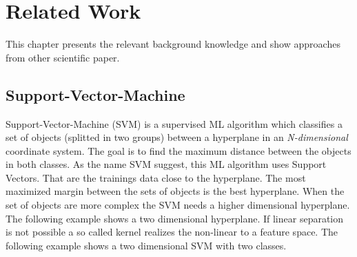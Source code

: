 
\section{Related Work}
\label{sec:relWork}

This chapter presents the relevant background knowledge and show approaches from other scientific paper.

\subsection{Support-Vector-Machine}

Support-Vector-Machine (SVM) is a supervised ML algorithm which classifies a set of objects (splitted in two groups) between a hyperplane in an \textit{N-dimensional} coordinate system. The goal is to find the maximum distance between the objects in both classes. As the name SVM suggest, this ML algorithm uses Support Vectors. That are the trainings data close to the hyperplane. The most maximized margin between the sets of objects is the best hyperplane. When the set of objects are more complex the SVM needs a higher dimensional hyperplane. The following example shows a two dimensional hyperplane. If linear separation is not possible a so called kernel realizes the non-linear to a feature space. The following example shows a two dimensional SVM with two classes. \\ \\

